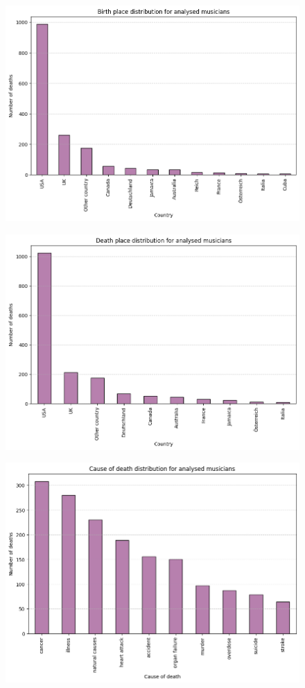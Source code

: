 \documentclass{article}
\begin{document}
\begin{figure}[H]
    \centering
    \includegraphics[width=0.8\linewidth]{graph_images/exploratory_analysis/birthplace.png}
    \label{fig:enter-label}
\end{figure}

\begin{figure}[H]
    \centering
    \includegraphics[width=0.8\linewidth]{graph_images/exploratory_analysis/deathplace.png}
    \label{fig:enter-label}
\end{figure}

\begin{figure}[H]
    \centering
    \includegraphics[width=0.8\linewidth]{graph_images/exploratory_analysis/deathcause.png}
    \label{fig:enter-label}
\end{figure}
\end{document}

